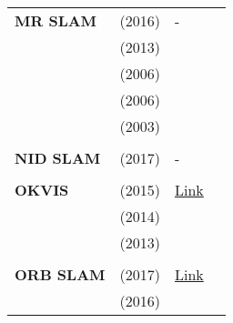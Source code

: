 \documentclass[a4paper,12pt]{scrartcl}
\begin{document}
{\begin{longtable}{l|l|l|l}
    \textbf{MR SLAM}       & \cite{Choudhary2016} (2016)       & -                                                                  &                       \\
                           & \cite{Alexandre2013} (2013)       &                                                                    &                       \\
                           & \cite{Zhou2006} (2006)            &                                                                    &                       \\
                           & \cite{Howard2006} (2006)          &                                                                    &                       \\
                           & \cite{Liu2003} (2003)             &                                                                    &                       \\
                           &                                   &                                                                    &                       \\
    \textbf{NID SLAM}      & \cite{Pascoe2017} (2017)          & -                                                                  &                       \\
                           &                                   &                                                                    &                       \\
    \textbf{OKVIS}         & \cite{Leutenegger2015} (2015)     & {\href{https://github.com/ethz-asl/okvis_ros}{Link}}               &                       \\
                           & \cite{Leutenegger2014} (2014)     &                                                                    &                       \\
                           & \cite{Leutenegger2013} (2013)     &                                                                    &                       \\
                           &                                   &                                                                    &                       \\
    \textbf{ORB SLAM}      & \cite{Mur-Artal2017} (2017)       & \href{https://github.com/raulmur/ORB_SLAM2}{Link}                  &                       \\
                           & \cite{Mur-Artal2016a} (2016)      &                                                                    &                       \\

\end{longtable}}
\end{document}
